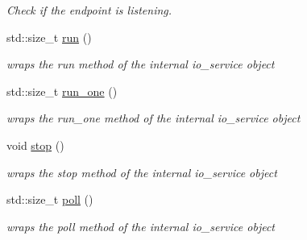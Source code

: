 \begin{DoxyCompactItemize}
\begin{DoxyCompactList}\small\item\em Check if the endpoint is listening. \end{DoxyCompactList}\item 
\mbox{\label{classwebsocketpp_1_1transport_1_1asio_1_1endpoint_a5c457ea6734a1d8aafe6c6f364996dfe}} 
std\+::size\+\_\+t \mbox{\hyperlink{classwebsocketpp_1_1transport_1_1asio_1_1endpoint_a5c457ea6734a1d8aafe6c6f364996dfe}{run}} ()
\begin{DoxyCompactList}\small\item\em wraps the run method of the internal io\+\_\+service object \end{DoxyCompactList}\item 
std\+::size\+\_\+t \mbox{\hyperlink{classwebsocketpp_1_1transport_1_1asio_1_1endpoint_a06b42e739e095b5ec489b59a655b2242}{run\+\_\+one}} ()
\begin{DoxyCompactList}\small\item\em wraps the run\+\_\+one method of the internal io\+\_\+service object \end{DoxyCompactList}\item 
\mbox{\label{classwebsocketpp_1_1transport_1_1asio_1_1endpoint_a5aaf6de5a0a7f868c60f5d611a8e399c}} 
void \mbox{\hyperlink{classwebsocketpp_1_1transport_1_1asio_1_1endpoint_a5aaf6de5a0a7f868c60f5d611a8e399c}{stop}} ()
\begin{DoxyCompactList}\small\item\em wraps the stop method of the internal io\+\_\+service object \end{DoxyCompactList}\item 
\mbox{\label{classwebsocketpp_1_1transport_1_1asio_1_1endpoint_aa73831b3e81e61cd95bfbfab799a41b7}} 
std\+::size\+\_\+t \mbox{\hyperlink{classwebsocketpp_1_1transport_1_1asio_1_1endpoint_aa73831b3e81e61cd95bfbfab799a41b7}{poll}} ()
\begin{DoxyCompactList}\small\item\em wraps the poll method of the internal io\+\_\+service object \end{DoxyCompactList}\item 
\mbox{\label{classwebsocketpp_1_1transport_1_1asio_1_1endpoint_ae413ac572300c418cfd822845960cc6c}} 

\end{DoxyCompactItemize}
